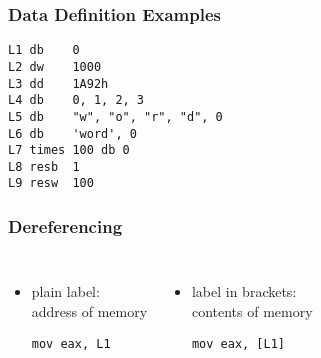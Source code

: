 \documentclass[dvipsnames]{beamer}
\begin{document}
\begin{frame}[fragile]
  \frametitle{Data Definition Examples}

  \begin{lstlisting}
L1 db    0
L2 dw    1000
L3 dd    1A92h
L4 db    0, 1, 2, 3
L5 db    "w", "o", "r", "d", 0
L6 db    'word', 0
L7 times 100 db 0
L8 resb  1
L9 resw  100
  \end{lstlisting}
\end{frame}

\begin{frame}[fragile]
  \frametitle{Dereferencing}

  \begin{columns}[t]
    \begin{itemize}
      \item plain label:\\
        address of memory

      \medskip
      \begin{example}
        \begin{lstlisting}
mov eax, L1
        \end{lstlisting}
      \end{example}
    \end{itemize}

    \begin{itemize}
      \item label in brackets:\\
        contents of memory

      \medskip
      \begin{example}
        \begin{lstlisting}
mov eax, [L1]
        \end{lstlisting}
      \end{example}
    \end{itemize}
  \end{columns}
\end{frame}
\end{document}
